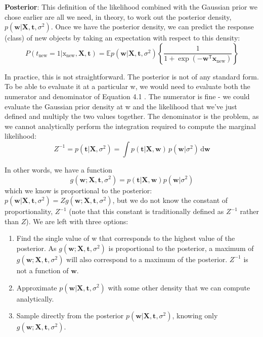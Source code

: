 \textbf{Posterior}: This definition of the likelihood combined with the Gaussian prior
we chose earlier are all we need, in theory, to work out the posterior density,
$p(\mathbf{w}|\mathbf{X}, \mathbf{t}, \sigma^2)$.
Once we have the posterior density, we can predict the response (class)
of new objects by taking an expectation with respect to this density:
\begin{equation*}
P(t_{\mathrm{new}}=1|\mathrm{x}_{\mathrm{new}},\mathbf{X},\mathbf{t}) =
\mathbb{E}{p(\mathbf{w}|\mathbf{X}, \mathbf{t}, \sigma^2)}
\left\{
\frac{1}{1 + \exp( -\mathbf{w}^{\mathsf{T}} \mathbf{x}_{\mathrm{new}} )}
\right\}
\end{equation*}

In practice, this is not straightforward. The posterior is not of any standard form.
To be able to evaluate it at a particular w, we would need to evaluate both the
numerator and denominator of Equation 4.1 . The numerator is fine - we could
evaluate the Gaussian prior density at w and the likelihood that we've just defined
and multiply the two values together. The denominator is the problem, as we cannot
analytically perform the integration required to compute the marginal likelihood:
\begin{equation*}
Z^{-1} = p(\mathbf{t}|\mathbf{X},\sigma^2) =
\int p(\mathbf{t} | \mathbf{X}, \mathbf{w}) \, p(\mathbf{w}|\sigma^2) \,
\mathrm{d}\mathbf{w}
\end{equation*}

In other words, we have a function
\begin{equation*}
g(\mathbf{w}; \mathbf{X}, \mathbf{t}, \sigma^2) =
p(\mathbf{t}|\mathbf{X}, \mathbf{w}) p(\mathbf{w}| \sigma^2)   
\end{equation*}
which we know is proportional to the posterior:
$p(\mathbf{w} | \mathbf{X}, \mathbf{t}, \sigma^2) = Z g(\mathbf{w}; \mathbf{X}, \mathbf{t}, \sigma^2)$,
but we do not know
the constant of proportionality, $Z^{-1}$
(note that this constant is traditionally defined as $Z^{-1}$
rather than $Z$).
We are left with three options:
\begin{enumerate}
%
\item Find the single value of w that corresponds to the highest value of the
posterior. As $g(\mathbf{w}; \mathbf{X}, \mathbf{t}, \sigma^2)$ is proportional
to the posterior, a maximum of
$g(\mathbf{w}; \mathbf{X}, \mathbf{t}, \sigma^2)$ will also correspond to a maximum of the posterior.
$Z^{-1}$ is not a function of $\mathbf{w}$.
%
\item Approximate $p(\mathbf{w} | \mathbf{X}, \mathbf{t}, \sigma^2)$ with some other density
that we can compute analytically.
%
\item Sample directly from the posterior $p(\mathbf{w} | \mathbf{X}, \mathbf{t}, \sigma^2)$,
knowing only $g(\mathbf{w}; \mathbf{X}, \mathbf{t}, \sigma^2)$.
\end{enumerate}

